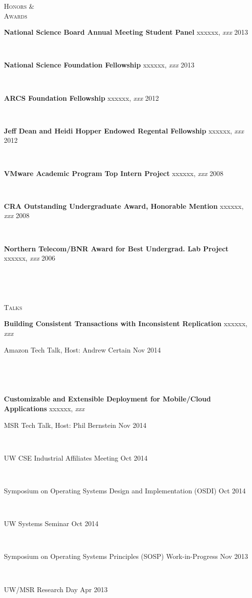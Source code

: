 \documentclass[10pt,times]{report}
\newlength{\sectiongap}
\newlength{\entrygap}
\newlength{\sectioncolwidth}
\newlength{\colgap}
\newlength{\stuffwidth}
\def\ifEqString#1#2{\def\testa{#1}\def\testb{#2}%
  \ifx\testa\testb}
\newenvironment{rtable}{
  \begin{minipage}{\textwidth}
  }{
  \end{minipage}
}
\newenvironment{rentry}[3][xxx]{
  \begin{minipage}[t]{\hsize}
    \textbf{#2}\ifEqString{#1}{xxx}\relax\else, \textit{#1}\fi
    \hspace{\stretch{1}} #3 \\
  }{
    \removelastskip
  \end{minipage}
  \\[\entrygap]  %
}
\newcommand{\rline}[2]{
  \begin{minipage}[t]{\hsize}
    #1 \hspace{\stretch{1}} #2
  \end{minipage} \\
}
\newenvironment{rsection}[1]{
  \begin{minipage}[t]{\sectioncolwidth}
    \textsc{#1}
  \end{minipage}
  \hspace{\colgap}
  \begin{minipage}[t]{\stuffwidth}
  }{
    \removelastskip
  \end{minipage}
  \\[\sectiongap]
}
\begin{document}
\begin{rtable}
\begin{rsection}{Honors \&\\Awards}
    \begin{rentry}{National Science Board Annual Meeting Student
        Panel}{2013}
    \end{rentry} \vspace{-0.5em}

    \begin{rentry}{National Science Foundation Fellowship}{2013}
    \end{rentry} \vspace{-0.5em}

    \begin{rentry}{ARCS Foundation Fellowship}{2012}
    \end{rentry} \vspace{-0.5em}

    \begin{rentry}{Jeff Dean and Heidi Hopper Endowed Regental Fellowship}{2012}
    \end{rentry} \vspace{-0.5em}

    \begin{rentry}{VMware Academic Program Top Intern Project}{2008}
    \end{rentry} \vspace{-0.5em}
    
    \begin{rentry}{CRA Outstanding Undergraduate Award, Honorable
      Mention}{2008}
    \end{rentry} \vspace{-0.5em}

    \begin{rentry}{Northern Telecom/BNR Award for Best Undergrad. Lab
        Project}{2006}
    \end{rentry}
  \end{rsection}

  \begin{rsection}{Talks}
    \begin{rentry}{Building Consistent Transactions with Inconsistent
        Replication}{}
      \rline{Amazon Tech Talk, Host: Andrew Certain}{Nov 2014}
    \end{rentry}

    \begin{rentry}{Customizable and Extensible Deployment for
        Mobile/Cloud Applications}{}
      \rline{MSR Tech Talk, Host: Phil Bernstein}{Nov 2014}
      \rline{UW CSE Industrial Affiliates Meeting}{Oct 2014}
      \rline{Symposium on Operating Systems Design and
        Implementation (OSDI)}{Oct 2014}
      \rline{UW Systems Seminar}{Oct 2014}
      \rline{Symposium on Operating Systems Principles (SOSP) Work-in-Progress}{Nov 2013}
      \rline{UW/MSR Research Day}{Apr 2013}
    \end{rentry}


\end{rsection}
\end{rtable}
\end{document}
